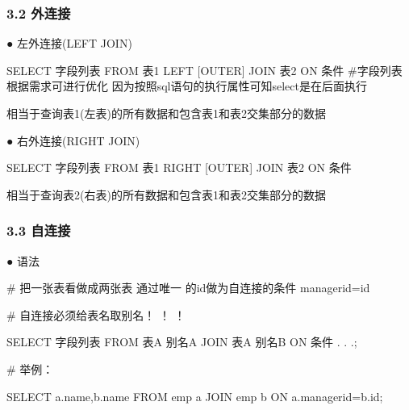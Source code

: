 \documentclass[
  letterpaper,
  DIV=11,
  numbers=noendperiod]{scrreprt}
\newenvironment{Shaded}{\begin{snugshade}}{\end{snugshade}}
\newcommand{\KeywordTok}[1]{\textcolor[rgb]{0.00,0.23,0.31}{#1}}
\newcommand{\NormalTok}[1]{\textcolor[rgb]{0.00,0.23,0.31}{#1}}
\newcommand{\OperatorTok}[1]{\textcolor[rgb]{0.37,0.37,0.37}{#1}}
\begin{document}
\hypertarget{ux5916ux8fdeux63a5}{%
\subsubsection{\texorpdfstring{\textbf{3.2}
\textbf{外连接}}{3.2 外连接}}\label{ux5916ux8fdeux63a5}}

\hspace{0pt} ● 左外连接(LEFT JOIN)

\begin{Shaded}
\begin{Highlighting}[]
\KeywordTok{SELECT}\NormalTok{ 字段列表 }\KeywordTok{FROM}\NormalTok{ 表1 }\KeywordTok{LEFT}\NormalTok{ [}\KeywordTok{OUTER}\NormalTok{] }\KeywordTok{JOIN}\NormalTok{ 表2 }\KeywordTok{ON}\NormalTok{ 条件 \#字段列表根据需求可进行优化 因为按照sql语句的执行属性可知select是在后面执行}
\end{Highlighting}
\end{Shaded}

相当于查询表1(左表)的所有数据和包含表1和表2交集部分的数据

\hspace{0pt} ● 右外连接(RIGHT JOIN)

\begin{Shaded}
\begin{Highlighting}[]
\KeywordTok{SELECT}\NormalTok{ 字段列表 }\KeywordTok{FROM}\NormalTok{ 表1 }\KeywordTok{RIGHT}\NormalTok{ [}\KeywordTok{OUTER}\NormalTok{] }\KeywordTok{JOIN}\NormalTok{ 表2 }\KeywordTok{ON}\NormalTok{ 条件}
\end{Highlighting}
\end{Shaded}

相当于查询表2(右表)的所有数据和包含表1和表2交集部分的数据

\hypertarget{ux81eaux8fdeux63a5}{%
\subsubsection{\texorpdfstring{\textbf{3.3}
\textbf{自连接}}{3.3 自连接}}\label{ux81eaux8fdeux63a5}}

\hspace{0pt} ● 语法

\begin{Shaded}
\begin{Highlighting}[]
\NormalTok{\# 把一张表看做成两张表 通过唯一 的id做为自连接的条件 managerid}\OperatorTok{=}\KeywordTok{id}

\NormalTok{\# 自连接必须给表名取别名！ ！ ！}

\KeywordTok{SELECT}\NormalTok{ 字段列表 }\KeywordTok{FROM}\NormalTok{ 表A 别名A }\KeywordTok{JOIN}\NormalTok{ 表A 别名B }\KeywordTok{ON}\NormalTok{ 条件 . . .;}

\NormalTok{\# 举例：}

\KeywordTok{SELECT}\NormalTok{ a.name,b.name }\KeywordTok{FROM}\NormalTok{ emp a }\KeywordTok{JOIN}\NormalTok{ emp b }\KeywordTok{ON}\NormalTok{ a.managerid}\OperatorTok{=}\NormalTok{b.}\KeywordTok{id}\NormalTok{;}
\end{Highlighting}
\end{Shaded}
\end{document}
